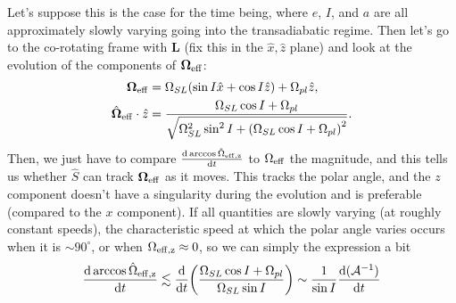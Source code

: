 \documentclass[11pt,
        usenames, %
        dvipsnames %
    ]{article}
\newcommand*{\rd}[2]{\frac{\mathrm{d}#1}{\mathrm{d}#2}}
\newcommand*{\bm}[1]{\boldsymbol{\mathbf{#1}}}
\DeclarePairedDelimiter\p{\lparen}{\rparen}
\begin{document}
Let's suppose this is the case for the time being, where $e$, $I$, and $a$ are
all approximately slowly varying going into the transadiabatic regime. Then
let's go to the co-rotating frame with $\bm{L}$ (fix this in the $\hat{x},
\hat{z}$ plane) and look at the evolution of the components of $\bm{\Omega}_{\rm
eff}$:
\begin{align}
    \bm{\Omega}_{\rm eff} &= \Omega_{SL}\p*{\sin I \hat{x} + \cos I \hat{z}}
            + \Omega_{pl} \hat{z},\\
    \hat{\bm{\Omega}}_{\rm eff} \cdot \hat{z}
        &= \frac{\Omega_{SL} \cos I + \Omega_{pl}}{
            \sqrt{\Omega_{SL}^2\sin^2 I + \p*{\Omega_{SL}\cos I
                + \Omega_{pl}}^2}}.
\end{align}
Then, we just have to compare $\rd{\arccos\hat{\Omega}_{\rm eff, z}}{t}$ to
$\Omega_{\rm eff}$ the magnitude, and this tells us whether $\hat{S}$ can track
$\bm{\Omega}_{\rm eff}$ as it moves. This tracks the polar angle, and the $z$
component doesn't have a singularity during the evolution and is preferable
(compared to the $x$ component). If all quantities are slowly varying (at
roughly constant speeds), the characteristic speed at which the polar angle
varies occurs when it is $\sim 90^\circ$, or when $\Omega_{\rm eff, z} \approx
0$, so we can simply the expression a bit
\begin{equation}
    \rd{\arccos\hat{\Omega}_{\rm eff, z}}{t}
        \lesssim \rd{}{t}\p*{\frac{\Omega_{SL} \cos I + \Omega_{pl}}{
            \Omega_{SL}\sin I}} \sim \frac{1}{\sin I}
                \rd{(\mathcal{A}^{-1})}{t}
\end{equation}
\end{document}

